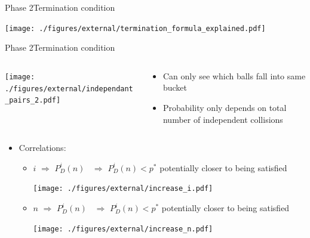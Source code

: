 \documentclass[aspectratio=169, hyperref={colorlinks=true, allcolors=SecondaryColor}, c]{beamer}
\begin{document}
	\begin{frame}[fragile]{Phase 2}{Termination condition}
		\vspace{0.2cm}

		\texttt{[image: ./figures/external/termination\_formula\_explained.pdf]}
	\end{frame}

	\begin{frame}[fragile]{Phase 2}{Termination condition}
		\begin{columns}
			\begin{column}{0.5\textwidth}
				\texttt{[image: ./figures/external/independant\_pairs\_2.pdf]}
			\end{column}
			\begin{column}{0.5\textwidth}
				\begin{itemize}
					\item Can only see which balls fall into same bucket
					\item Probability \alert{only} depends on \alert{total number of independent collisions}
				\end{itemize}
			\end{column}
		\end{columns}
		\begin{itemize}
			\item \alert{Correlations}:
			\begin{itemize}
				\item {\thickuparrow} $i$ \alert{$\Rightarrow$} $P^i_D(n)$ {\thickdownarrow}\, \alert{$\Rightarrow$} $P^i_D(n) < p^*$ potentially closer to being satisfied %
				\vspace{-0.4cm}

				\texttt{[image: ./figures/external/increase\_i.pdf]} %
				\item {\thickuparrow} $n$ \alert{$\Rightarrow$} $P^i_D(n)$ {\thickdownarrow}\, \alert{$\Rightarrow$} $P^i_D(n) < p^*$ potentially closer to being satisfied %
				\vspace{-0.4cm}

				\texttt{[image: ./figures/external/increase\_n.pdf]} %
			\end{itemize}
		\end{itemize}
	\end{frame}
\end{document}
